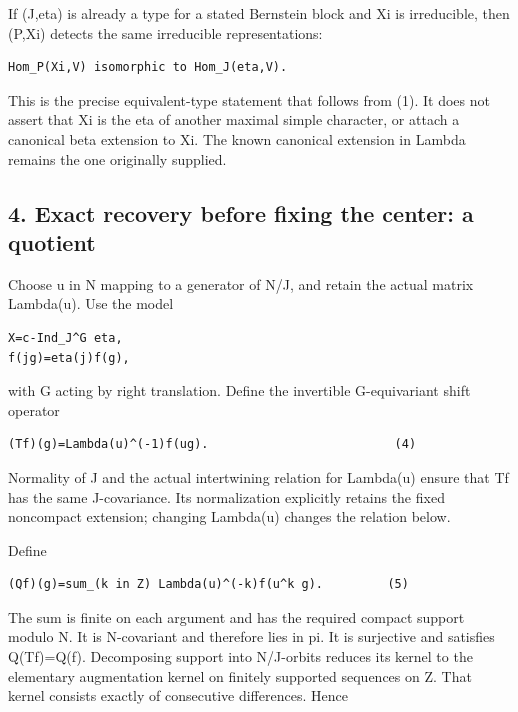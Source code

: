 If (J,eta) is already a type for a stated Bernstein block and Xi is
irreducible, then (P,Xi) detects the same irreducible representations:

\begin{Verbatim}[fontsize=\small,breaklines=true,breakanywhere=true]
Hom_P(Xi,V) isomorphic to Hom_J(eta,V).
\end{Verbatim}

This is the precise equivalent-type statement that follows from (1). It
does not assert that Xi is the eta of another maximal simple character,
or attach a canonical beta extension to Xi. The known canonical
extension in Lambda remains the one originally supplied.

\hypertarget{lowrank_contract-exact-recovery-before-fixing-the-center-a-quotient}{%
\subsection{4. Exact recovery before fixing the center: a
quotient}\label{lowrank_contract-exact-recovery-before-fixing-the-center-a-quotient}}

Choose u in N mapping to a generator of N/J, and retain the actual
matrix Lambda(u). Use the model

\begin{Verbatim}[fontsize=\small,breaklines=true,breakanywhere=true]
X=c-Ind_J^G eta,
f(jg)=eta(j)f(g),
\end{Verbatim}

with G acting by right translation. Define the invertible G-equivariant
shift operator

\begin{Verbatim}[fontsize=\small,breaklines=true,breakanywhere=true]
(Tf)(g)=Lambda(u)^(-1)f(ug).                          (4)
\end{Verbatim}

Normality of J and the actual intertwining relation for Lambda(u) ensure
that Tf has the same J-covariance. Its normalization explicitly retains
the fixed noncompact extension; changing Lambda(u) changes the relation
below.

Define

\begin{Verbatim}[fontsize=\small,breaklines=true,breakanywhere=true]
(Qf)(g)=sum_(k in Z) Lambda(u)^(-k)f(u^k g).         (5)
\end{Verbatim}

The sum is finite on each argument and has the required compact support
modulo N. It is N-covariant and therefore lies in pi. It is surjective
and satisfies Q(Tf)=Q(f). Decomposing support into N/J-orbits reduces
its kernel to the elementary augmentation kernel on finitely supported
sequences on Z. That kernel consists exactly of consecutive differences.
Hence

